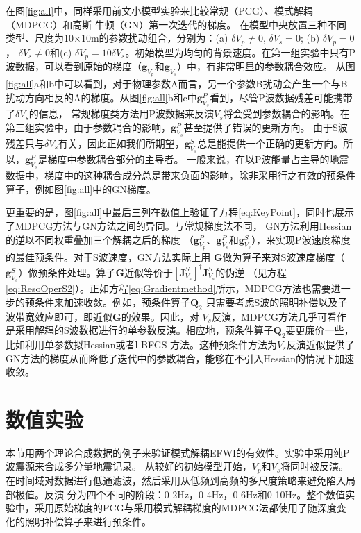 在图\ref{fig:all}中，同样采用前文小模型实验来比较常规（PCG）、模式解耦（MDPCG）和高斯-牛顿（GN）第一次迭代的梯度。
在模型中央放置三种不同类型、尺度为10$\times$10m的参数扰动组合，分别为：(a) $\delta V_p \neq 0$, $\delta V_s = 0$; (b) $\delta V_p = 0$，
$\delta V_s \neq 0$和(c) $\delta V_p =10\delta
V_s$。初始模型为均匀的背景速度。在第一组实验中只有P波数据，可以看到原始的梯度（$\mathbf{g}_{V_p}$和$\mathbf{g}_{V_s}$）中，有非常明显的参数耦合效应。
从图\ref{fig:all}a和b中可以看到，对于物理参数A而言，另一个参数B扰动会产生一个与B扰动方向相反的A的梯度。从图\ref{fig:all}b和c中$\mathbf{g}^{P}_{V_s}$看到，尽管P波数据残差可能携带了$\delta V_s$的信息，
常规梯度类方法用P波数据来反演$V_s$将会受到参数耦合的影响。在第三组实验中，由于参数耦合的影响，$\mathbf{g}^P_{V_s}$甚至提供了错误的更新方向。
由于S波残差只与$\delta
V_s$有关，因此正如我们所期望，$\mathbf{g}^S_{V_s}$总是能提供一个正确的更新方向。所以，$\mathbf{g}^P_{V_s}$是梯度中参数耦合部分的主导者。
一般来说，在以P波能量占主导的地震数据中，梯度中的这种耦合成分总是带来负面的影响，除非采用行之有效的预条件算子，例如图\ref{fig:all}中的GN梯度。

更重要的是，图\ref{fig:all}中最后三列在数值上验证了方程\eqref{eq:KeyPoint}，同时也展示了MDPCG方法与GN方法之间的异同。与常规梯度法不同，
GN方法利用Hessian的逆以不同权重叠加三个解耦之后的梯度
（$\mathbf{g}^P_{V_p}$、$\mathbf{g}^P_{V_s}$和$\mathbf{g}^S_{V_s}$），来实现P波速度梯度的最佳预条件。对于S波速度，GN方法实际上用
$\mathbf{G}$做为算子来对S波速度梯度（$\mathbf{g}^S_{V_s}$）做预条件处理。算子$\mathbf{G}$近似等价于$[\mathbf{J}^{S}_{V_s}]^{\dagger}\mathbf{J}^{S}_{V_s}$的伪逆
（见方程\ref{eq:ResoOperS2}）。正如方程\eqref{eq:Gradientmethod}所示，MDPCG方法也需要进一步的预条件来加速收敛。例如，预条件算子$\mathbf{Q}_2$
只需要考虑S波的照明补偿以及子波带宽效应即可，即近似$\mathbf{G}$的效果。因此，对
$V_s$反演，MDPCG方法几乎可看作是采用解耦的S波数据进行的单参数反演。相应地，预条件算子$\mathbf{Q}_2$要更廉价一些，比如利用单参数拟Hessian或者l-BFGS
方法。这种预条件方法为$V_s$反演近似提供了GN方法的梯度从而降低了迭代中的参数耦合，能够在不引入Hessian的情况下加速收敛。

\section{数值实验}
本节用两个理论合成数据的例子来验证模式解耦EFWI的有效性。实验中采用纯P波震源来合成多分量地震记录。
从较好的初始模型开始，$V_p$和$V_s$将同时被反演。在时间域对数据进行低通滤波，然后采用从低频到高频的多尺度策略来避免陷入局部极值。反演
分为四个不同的阶段：0-2Hz，0-4Hz，0-6Hz和0-10Hz。整个数值实验中，采用原始梯度的PCG与采用模式解耦梯度的MDPCG法都使用了随深度变化的照明补偿算子来进行预条件\cite[]{kohn:2012}。
